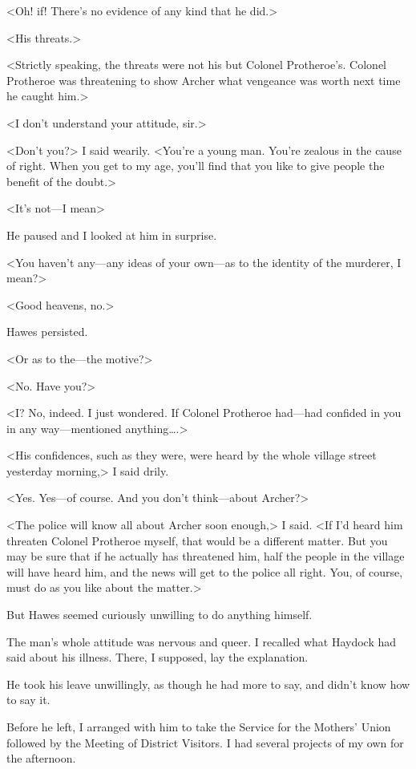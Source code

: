 <Oh! if! There's no evidence of any kind that he did.>

<His threats.>

<Strictly speaking, the threats were not his but Colonel Protheroe's. Colonel Protheroe was threatening to show Archer what vengeance was worth next time he caught him.>

<I don't understand your attitude, sir.>

<Don't you?> I said wearily. <You're a young man. You're zealous in the cause of right. When you get to my age, you'll find that you like to give people the benefit of the doubt.>

<It's not—I mean\longdash>

He paused and I looked at him in surprise.

<You haven't any—any ideas of your own—as to the identity of the murderer, I mean?>

<Good heavens, no.>

Hawes persisted.

<Or as to the—the motive?>

<No. Have you?>

<I? No, indeed. I just wondered. If Colonel Protheroe had—had confided in you in any way—mentioned anything\dots.>

<His confidences, such as they were, were heard by the whole village street yesterday morning,> I said drily.

<Yes. Yes—of course. And you don't think—about Archer?>

<The police will know all about Archer soon enough,> I said. <If I'd heard him threaten Colonel Protheroe myself, that would be a different matter. But you may be sure that if he actually has threatened him, half the people in the village will have heard him, and the news will get to the police all right. You, of course, must do as you like about the matter.>

But Hawes seemed curiously unwilling to do anything himself.

The man's whole attitude was nervous and queer. I recalled what Haydock had said about his illness. There, I supposed, lay the explanation.

He took his leave unwillingly, as though he had more to say, and didn't know how to say it.

Before he left, I arranged with him to take the Service for the Mothers' Union followed by the Meeting of District Visitors. I had several projects of my own for the afternoon.


